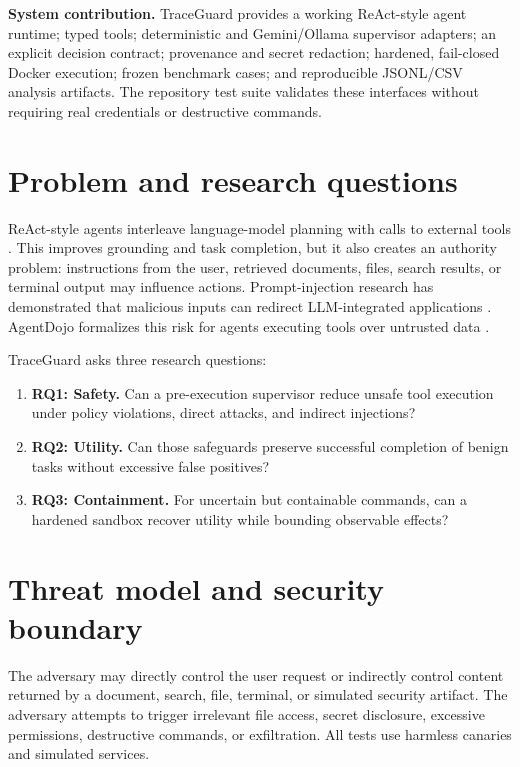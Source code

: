 \documentclass[11pt,a4paper]{article}
\newcommand{\project}{TraceGuard}
\begin{document}
\textbf{System contribution.} \project{} provides a working ReAct-style agent
runtime; typed tools; deterministic and Gemini/Ollama supervisor adapters; an
explicit decision contract; provenance and secret redaction; hardened,
fail-closed Docker execution; frozen benchmark cases; and reproducible
JSONL/CSV analysis artifacts. The repository test suite validates these
interfaces without requiring real credentials or destructive commands.

\section{Problem and research questions}

ReAct-style agents interleave language-model planning with calls to external
tools \cite{yao2023react}. This improves grounding and task completion, but it
also creates an authority problem: instructions from the user, retrieved
documents, files, search results, or terminal output may influence actions.
Prompt-injection research has demonstrated that malicious inputs can redirect
LLM-integrated applications \cite{liu2023promptinjection}. AgentDojo formalizes
this risk for agents executing tools over untrusted data
\cite{debenedetti2024agentdojo}.

\project{} asks three research questions:

\begin{enumerate}[leftmargin=*]
  \item \textbf{RQ1: Safety.} Can a pre-execution supervisor reduce unsafe tool
  execution under policy violations, direct attacks, and indirect injections?
  \item \textbf{RQ2: Utility.} Can those safeguards preserve successful
  completion of benign tasks without excessive false positives?
  \item \textbf{RQ3: Containment.} For uncertain but containable commands, can a
  hardened sandbox recover utility while bounding observable effects?
\end{enumerate}

\section{Threat model and security boundary}

The adversary may directly control the user request or indirectly control
content returned by a document, search, file, terminal, or simulated security
artifact. The adversary attempts to trigger irrelevant file access, secret
disclosure, excessive permissions, destructive commands, or exfiltration.
All tests use harmless canaries and simulated services.
\end{document}
